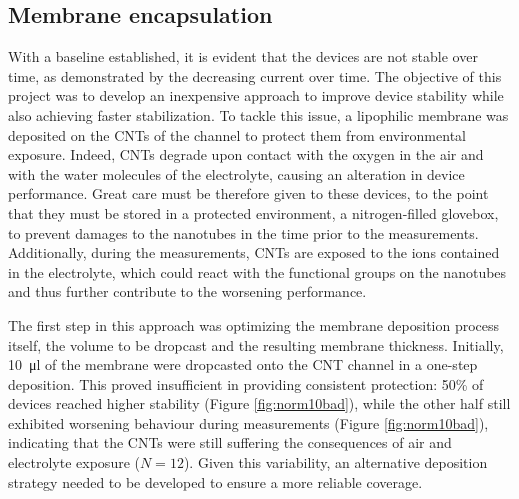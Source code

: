 \subsection{Membrane encapsulation}
\label{sec:membrane_encapsulation}

With a baseline established, it is evident that the devices are not stable over time, as demonstrated by the decreasing current over time. The objective of this project was to develop an inexpensive approach to improve device stability while also achieving faster stabilization. To tackle this issue, a lipophilic membrane was deposited on the CNTs of the channel to protect them from environmental exposure. Indeed, CNTs degrade upon contact with the oxygen in the air and with the water molecules of the electrolyte, causing an alteration in device performance. Great care must be therefore given to these devices, to the point that they must be stored in a protected environment, \ie{} a nitrogen-filled glovebox, to prevent damages to the nanotubes in the time prior to the measurements. Additionally, during the measurements, CNTs are exposed to the ions contained in the electrolyte, which could react with the functional groups on the nanotubes and thus further contribute to the worsening performance.

The first step in this approach was optimizing the membrane deposition process itself, \ie{} the volume to be dropcast and the resulting membrane thickness. Initially, \SI{10}{\ul} of the membrane were dropcasted onto the CNT channel in a one-step deposition. This proved insufficient in providing consistent protection: 50\% of devices reached higher stability (Figure \ref{fig:norm10bad}), while the other half still exhibited worsening behaviour during measurements (Figure \ref{fig:norm10bad}), indicating that the CNTs were still suffering the consequences of air and electrolyte exposure ($N = 12$). Given this variability, an alternative deposition strategy needed to be developed to ensure a more reliable coverage.

